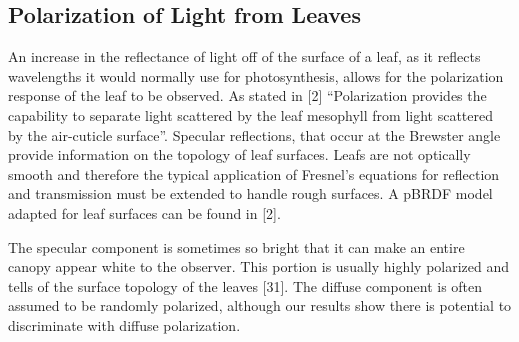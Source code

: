 \subsection{Polarization of Light from Leaves}

An increase in the reflectance of light off of the surface of a leaf, as it reflects wavelengths it would normally use for photosynthesis, allows for the polarization response of the leaf to be observed.  As stated in [2] “Polarization provides the capability to separate light scattered by the leaf mesophyll from light scattered by the air-cuticle surface”.  Specular reflections, that occur at the Brewster angle provide information on the topology of leaf surfaces.  Leafs are not optically smooth and therefore the typical application of Fresnel’s equations for reflection and transmission must be extended to handle rough surfaces. A pBRDF model adapted for leaf surfaces can be found in [2].

The specular component is sometimes so bright that it can make an entire canopy appear white to the observer.  This portion is usually highly polarized and tells of the surface topology of the leaves [31].  The diffuse component is often assumed to be randomly polarized, although our results show there is potential to discriminate with diffuse polarization.
